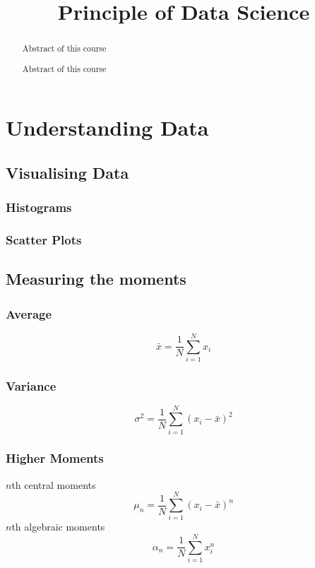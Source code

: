 \documentclass[12pt,a4paper]{article}
\newcommand{\topic}{Principle of Data Science}
\begin{document}
\title{\topic}

\begin{titlepage}
    \maketitle
\end{titlepage}

\tableofcontents

\newpage
\begin{abstract}
\noindent
Abstract of this course
\end{abstract}

\newpage
\begin{abstract}
\noindent
Abstract of this course
\end{abstract}

\section{Understanding Data}
\subsection{Visualising Data}
\subsubsection{Histograms}
\subsubsection{Scatter Plots}
\subsection{Measuring the moments}
\subsubsection{Average}
$$
\bar{x}=\frac{1}{N} \sum_{i=1}^N x_i
$$
\subsubsection{Variance}
$$
\sigma^2=\frac{1}{N} \sum_{i=1}^N\left(x_i-\bar{x}\right)^2
$$
\subsubsection{Higher Moments}
$n$th central moments
$$
\mu_n=\frac{1}{N} \sum_{i=1}^N\left(x_i-\bar{x}\right)^n
$$
$n$th algebraic moments
$$
\alpha_n=\frac{1}{N} \sum_{i=1}^N x_i^n
$$
\end{document}
